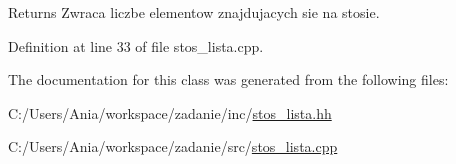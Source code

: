 \begin{DoxyReturn}{Returns}
Zwraca liczbe elementow znajdujacych sie na stosie. 
\end{DoxyReturn}


Definition at line 33 of file stos\-\_\-lista.\-cpp.



The documentation for this class was generated from the following files\-:\begin{DoxyCompactItemize}
\item 
C\-:/\-Users/\-Ania/workspace/zadanie/inc/\hyperlink{stos__lista_8hh}{stos\-\_\-lista.\-hh}\item 
C\-:/\-Users/\-Ania/workspace/zadanie/src/\hyperlink{stos__lista_8cpp}{stos\-\_\-lista.\-cpp}\end{DoxyCompactItemize}
